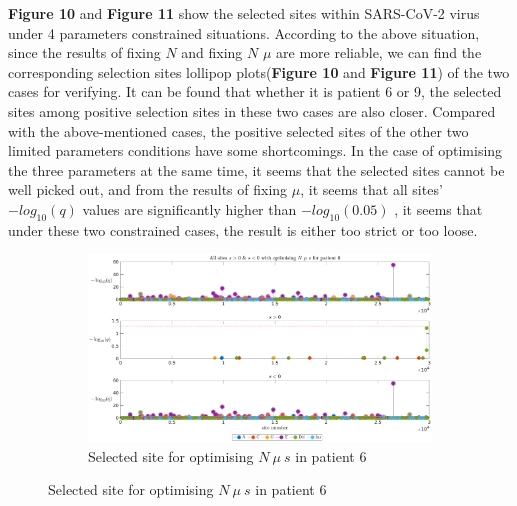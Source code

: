 \documentclass[12pt]{article}
\begin{document}
\textbf{Figure 10} and \textbf{Figure 11} show the selected sites within SARS-CoV-2 virus under 4 parameters constrained situations. According to the above situation, since the results of fixing $N$ and fixing $N$ $\mu$ are more reliable, we can find the corresponding selection sites lollipop plots(\textbf{Figure 10} and \textbf{Figure 11}) of the two cases for verifying. It can be found that whether it is patient 6 or 9, the selected sites among positive selection sites in these two cases are also closer. Compared with the above-mentioned cases, the positive selected sites of the other two limited parameters conditions have some shortcomings. In the case of optimising the three parameters at the same time, it seems that the selected sites cannot be well picked out, and from the results of fixing $\mu$, it seems that all sites' $-log_{10}(q)$ values are significantly higher than $-log_{10}(0.05)$ , it seems that under these two constrained cases, the result is either too strict or too loose.\\



\begin{figure}[H]
    \centering
    \hspace{-6cm}
    \vspace{-4cm}
    \begin{subfigure}{0.7\textwidth}
    \hspace{-2.5cm}
            \includegraphics[height=0.5\textheight]{figures/patient/pt6/pt6_site_all_opt.eps}
        
        \caption{Selected site for optimising $N\ \mu\ s$ in patient 6}
        \label{fig:subfig1}
    \end{subfigure}
        \end{figure}
\end{document}
